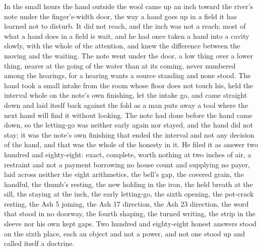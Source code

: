In the small hours the hand outside the wool came up an inch toward the river's note under the finger's-width door, the way a hand goes up in a field it has learned not to disturb. It did not reach, and the inch was not a reach; most of what a hand does in a field is wait, and he had once taken a hand into a cavity slowly, with the whole of the attention, and knew the difference between the moving and the waiting. The note went  under the door, a low thing over a lower thing, nearer at the going of the water than at its coming, never numbered among the hearings, for a hearing wants a source standing and none stood. The hand took a small intake from the room whose floor does not touch his, held the interval whole on the note's own finishing, let the intake go, and came straight down and laid itself back against the fold as a man puts away a tool where the next hand will find it without looking. The note had done before the hand came down, so the letting-go was neither early again nor stayed, and the hand did not stay; it was the note's own finishing that ended the interval and not any decision of the hand, and that was the whole of the honesty in it. He filed it as answer two hundred and eighty-eight: exact, complete, worth nothing at two inches of air, a restraint and not a payment borrowing no house count and supplying no payer, laid across neither the eight arithmetics, the bell's gap, the covered grain, the handful, the thumb's resting, the new holding in the iron, the held breath at the sill, the staying at the inch, the early letting-go, the sixth opening, the pot-crack resting, the Ash 5 joining, the Ash 17 direction, the Ash 23 direction, the word that stood in no doorway, the fourth shaping, the turned writing, the strip in the sleeve nor his own kept gaps. Two hundred and eighty-eight honest answers stood on the sixth place, each an object and not a power, and not one stood up and called itself a doctrine.

